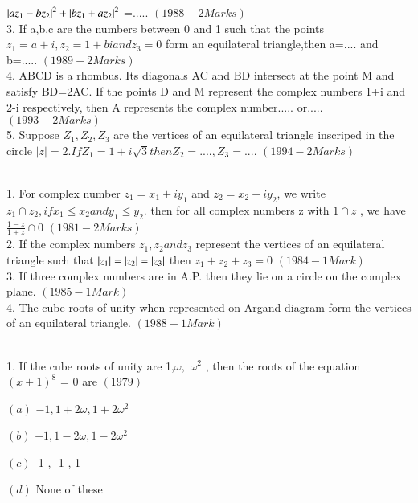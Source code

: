 \documentclass[journal,12pt,twocolumn]{IEEEtran}
\theoremstyle{remark}
\begin{document}
$\left\vert az_1-bz_2\right\vert^2+\left\vert bz_1+az_2\right\vert^2$ =.....  \hfill$(1988 - 2 Marks)$\\
3.  If a,b,c are the numbers between 0 and 1 such that the points $z_1=a+i, z_2=1+bi andz_3=0$ form an equilateral triangle,then a=.... and b=..... \hfill$(1989 - 2 Marks)$\\
4.  ABCD is a rhombus. Its diagonals AC and BD intersect at the point M and satisfy BD=2AC. If the points D and M represent the complex numbers 1+i and 2-i respectively, then A represents the complex number..... or..... \hfill$(1993 - 2 Marks)$\\
5.  Suppose $Z_1,Z_2,Z_3$ are the vertices of an equilateral triangle inscriped in the circle $|z|=2.If Z_1=1+i\sqrt{3}     then Z_2=....,Z_3=.... $ \hfill$(1994 - 2 Marks)$\\
\\
1.  For complex number $z_1=x_1+iy_1 $ and $z_2=x_2+iy_2$, we write $z_1\cap z_2, ifx_1\leq x_2 and y_1\leq y_2. $ then for all complex numbers z with $1\cap z$ , we have $\frac{1-z}{1+z} \cap 0$  \hfill$(1981 - 2 Marks)$\\
2.  If the complex numbers $z_1,z_2  and z_3 $ represent the vertices of an equilateral triangle such that $ \left\vert z_1\right\vert = \left\vert z_2\right\vert=\left\vert z_3\right\vert $ then $z_1+z_2+z_3 = 0$ \hfill$(1984 - 1 Mark)$\\
3.  If three complex numbers are in A.P. then they lie on a circle on the complex plane. \hfill$(1985 - 1 Mark)$\\
4.  The cube roots of unity when represented on Argand diagram form the vertices of an equilateral triangle. \hfill$(1988 - 1 Mark)$\\
\\
1.  If the cube roots of unity are 1,$\omega , $ $\omega^2$ , then the roots of the equation $(x+1)^8$ = 0 are                     \hfill$(1979)$
\begin{multicols} 
\item $(a)$  $-1 , 1+2\omega ,1+2\omega^2 $
\item $(b)$  $-1  , 1-2\omega , 1-2\omega^2$
\item $(c)$  -1 , -1 ,-1 
\item $(d)$   None of these\\
\end{multicols}
\end{document}
